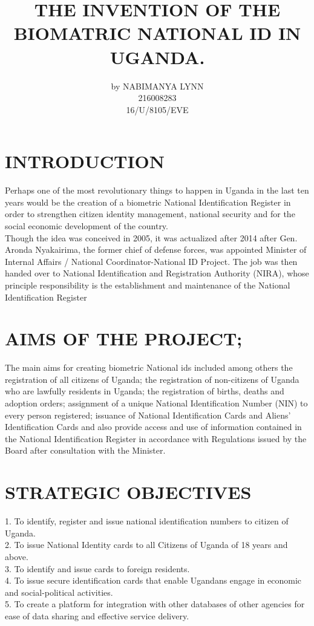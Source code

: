 \documentclass[10pt,letterpaper]{article}
\begin{document}
\title{ THE INVENTION OF THE BIOMATRIC NATIONAL ID IN UGANDA.}
\author{by NABIMANYA LYNN  \\ 216008283 \\  16/U/8105/EVE}
\maketitle
\section{INTRODUCTION }
Perhaps one of the most revolutionary things to happen in Uganda in the last ten years would be the creation of a biometric National Identification Register in order to strengthen citizen identity management, national security and for the social economic development of the country.\\
 Though the idea was conceived in 2005, it was actualized after 2014 after Gen. Aronda Nyakairima, the former chief of defense forces, was appointed Minister of Internal Affairs / National Coordinator-National ID Project. The job was then handed over to National Identification and Registration Authority (NIRA), whose principle responsibility is the establishment and maintenance of the National Identification Register

\section{AIMS OF THE PROJECT; }
The main aims for creating biometric National ids included among others the registration of all citizens of Uganda; the registration of non-citizens of Uganda who are lawfully residents in Uganda; the registration of births, deaths and adoption orders; assignment of a unique National Identification Number (NIN) to every person registered; issuance of National Identification Cards and Aliens’ Identification Cards and also provide access and use of information contained in the National Identification Register in accordance with Regulations issued by the Board after consultation with the Minister.
\section{STRATEGIC OBJECTIVES}
1.   To identify, register and issue national identification numbers to citizen of Uganda.\\
2.  To issue National Identity cards to all Citizens of Uganda of 18 years and above.\\
3.    To identify and issue cards to foreign residents.\\
4.  To issue secure identification cards that enable Ugandans engage in economic and social-political activities.\\	
5.  To create a platform for integration with other databases of other agencies for ease of data sharing and effective service delivery.\\
\end{document}
